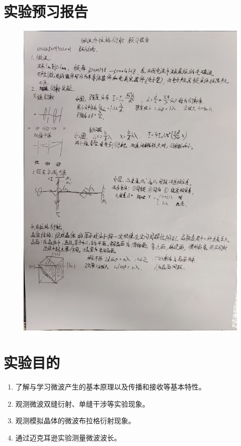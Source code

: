 \documentclass[11pt]{article}
\begin{document}
\section{实验预习报告}
\begin{figure}[H]
    \centering
    \includegraphics[width=13.5cm]{Fig/1.jpg}
\end{figure}

\section{实验目的}
\begin{enumerate}
    \item 了解与学习微波产生的基本原理以及传播和接收等基本特性。
    \item 观测微波双缝衍射、单缝干涉等实验现象。
    \item 观测模拟晶体的微波布拉格衍射现象。
    \item 通过迈克耳逊实验测量微波波长。
\end{enumerate}
\end{document}
